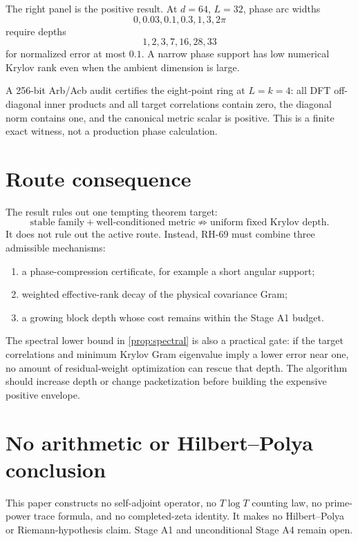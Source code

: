 \documentclass[11pt]{article}
\begin{document}
The right panel is the positive result.  At $d=64$, $L=32$, phase arc widths
\[
 0, 0.03, 0.1, 0.3, 1, 3, 2\pi
\]
require depths
\[
 1, 2, 3, 7, 16, 28, 33
\]
for normalized error at most $0.1$.  A narrow phase support has low numerical
Krylov rank even when the ambient dimension is large.

A 256-bit Arb/Acb audit certifies the eight-point ring at $L=k=4$: all DFT
off-diagonal inner products and all target correlations contain zero, the
diagonal norm contains one, and the canonical metric scalar is positive.
This is a finite exact witness, not a production phase calculation.

\section{Route consequence}
\label{sec:route}

The result rules out one tempting theorem target:
\[
 \text{stable family}+\text{well-conditioned metric}
 \not\Longrightarrow \text{uniform fixed Krylov depth}.
\]
It does not rule out the active route.  Instead, RH-69 must combine three
admissible mechanisms:

\begin{enumerate}[leftmargin=2.2em]
 \item a phase-compression certificate, for example a short angular support;
 \item weighted effective-rank decay of the physical covariance Gram;
 \item a growing block depth whose cost remains within the Stage A1 budget.
\end{enumerate}

The spectral lower bound in \cref{prop:spectral} is also a practical gate: if
the target correlations and minimum Krylov Gram eigenvalue imply a lower
error near one, no amount of residual-weight optimization can rescue that
depth.  The algorithm should increase depth or change packetization before
building the expensive positive envelope.

\section{No arithmetic or Hilbert--Polya conclusion}

This paper constructs no self-adjoint operator, no $T\log T$ counting law,
no prime-power trace formula, and no completed-zeta identity.  It makes no
Hilbert--Polya or Riemann-hypothesis claim.  Stage A1 and unconditional Stage
A4 remain open.
\end{document}
